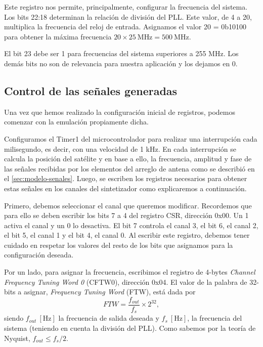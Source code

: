 \documentclass{article}
\newenvironment{standalone}{\begin{preview}}{\end{preview}}
\begin{document}
\begin{standalone}
  Este registro nos permite, principalmente, configurar la frecuencia del sistema.
  Los bits 22:18 determinan la relación de división del PLL.
  Este valor, de 4 a 20, multiplica la frecuencia del reloj de entrada.
  Asignamos el valor 20 = 0b10100 para obtener la máxima frecuencia $20 \times 25 \ \si{\mega\hertz} = 500 \ \si{\mega\hertz}$.

  El bit 23 debe ser 1 para frecuencias del sistema superiores a 255 MHz.
  Los demás bits no son de relevancia para nuestra aplicación y los dejamos en 0.

  \subsection{Control de las señales generadas}

  Una vez que hemos realizado la configuración inicial de registros, podemos comenzar con la emulación propiamente dicha.

  Configuramos el Timer1 del microcontrolador para realizar una interrupción cada milisegundo, es decir, con una velocidad de 1 kHz.
  En cada interrupción se calcula la posición del satélite y en base a ello, la frecuencia, amplitud y fase de las señales recibidas por los elementos del arreglo de antena como se describió en el \cref{sec:modelo-senales}.
  Luego, se escriben los registros necesarios para obtener estas señales en los canales del sintetizador como explicaremos a continuación.

  Primero, debemos seleccionar el canal que queremos modificar.
  Recordemos que para ello se deben escribir los bits 7 a 4 del registro CSR, dirección 0x00.
  Un 1 activa el canal y un 0 lo desactiva.
  El bit 7 controla el canal 3, el bit 6, el canal 2, el bit 5, el canal 1 y el bit 4, el canal 0.
  Al escribir este registro, debemos tener cuidado en respetar los valores del resto de los bits que asignamos para la configuración deseada.

  Por un lado, para asignar la frecuencia, escribimos el registro de 4-bytes \textit{Channel Frequency Tuning Word 0} (CFTW0), dirección 0x04.
  El valor de la palabra de 32-bits a asignar, \textit{Frequency Tuning Word} (FTW), está dada por
  \begin{equation}
    FTW = \frac{ f_{out} }{ f_s } \times 2^{32},
  \end{equation}
  siendo $f_{out} \ [\si{\hertz}]$ la frecuencia de salida deseada y $f_s \ [\si{\hertz}]$, la frecuencia del sistema (teniendo en cuenta la división del PLL).
  Como sabemos por la teoría de Nyquist, $f_{out} \leq f_s / 2$.


\end{standalone}
\end{document}
